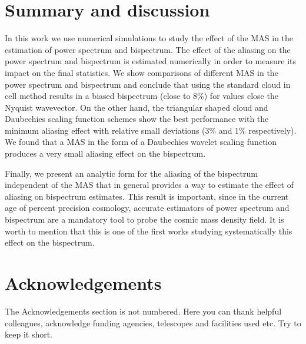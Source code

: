 \documentclass[a4paper,fleqn,usenatbib]{mnras}
\begin{document}


\section{Summary and discussion}

In this work we use numerical simulations to study the effect of the MAS in the estimation of power 
spectrum and bispectrum. The effect of the aliasing on the power spectrum and bispectrum is 
estimated numerically in order to measure its impact on the final statistics. We show comparisons of 
different MAS in the power spectrum and bispectrum and conclude that using the standard cloud in 
cell method results in a biased bispectrum (close to 8\%) for values close the Nyquist 
wavevector. On the other hand,   the triangular shaped cloud and Daubechies 
scaling function schemes 
show the best performance with the minimum aliasing effect with relative small deviations (3\% and 
1\% respectively). We found that a MAS in the form of a Daubechies wavelet scaling function produces 
a very small aliasing effect on the bispectrum. 

Finally, we present an analytic form for the 
aliasing of the bispectrum independent of the MAS that in general provides a way to estimate the 
effect of aliasing on bispectrum estimates. This result is important, since in the current age of 
percent precision cosmology, accurate estimators of power spectrum and bispectrum are a mandatory 
tool to probe the cosmic mass density field. It is worth to mention that this is one of the first 
works studying systematically this effect on the bispectrum.


\section*{Acknowledgements}

The Acknowledgements section is not numbered. Here you can thank helpful
colleagues, acknowledge funding agencies, telescopes and facilities used etc.
Try to keep it short.





\end{document}
